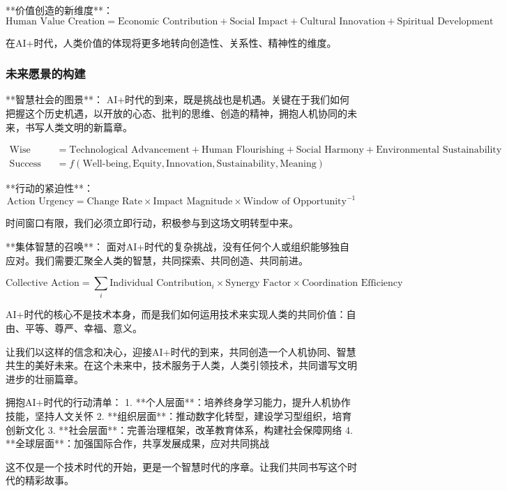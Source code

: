 **价值创造的新维度**：
\begin{equation}
\text{Human Value Creation} = \text{Economic Contribution} + \text{Social Impact} + \text{Cultural Innovation} + \text{Spiritual Development}
\end{equation}

在AI+时代，人类价值的体现将更多地转向创造性、关系性、精神性的维度。

\subsubsection{未来愿景的构建} %

**智慧社会的图景**：
AI+时代的到来，既是挑战也是机遇。关键在于我们如何把握这个历史机遇，以开放的心态、批判的思维、创造的精神，拥抱人机协同的未来，书写人类文明的新篇章。

\begin{align}
\text{Wise Society} &= \text{Technological Advancement} + \text{Human Flourishing} + \text{Social Harmony} + \text{Environmental Sustainability} \\
\text{Success Metrics} &= f(\text{Well-being}, \text{Equity}, \text{Innovation}, \text{Sustainability}, \text{Meaning})
\end{align}

**行动的紧迫性**：
\begin{equation}
\text{Action Urgency} = \text{Change Rate} \times \text{Impact Magnitude} \times \text{Window of Opportunity}^{-1}
\end{equation}

时间窗口有限，我们必须立即行动，积极参与到这场文明转型中来。

**集体智慧的召唤**：
面对AI+时代的复杂挑战，没有任何个人或组织能够独自应对。我们需要汇聚全人类的智慧，共同探索、共同创造、共同前进。

\begin{equation}
\text{Collective Action} = \sum_{i} \text{Individual Contribution}_i \times \text{Synergy Factor} \times \text{Coordination Efficiency}
\end{equation}

\begin{center}
AI+时代的核心不是技术本身，而是我们如何运用技术来实现人类的共同价值：自由、平等、尊严、幸福、意义。
\end{center}

让我们以这样的信念和决心，迎接AI+时代的到来，共同创造一个人机协同、智慧共生的美好未来。在这个未来中，技术服务于人类，人类引领技术，共同谱写文明进步的壮丽篇章。

\begin{center}
拥抱AI+时代的行动清单：
1. **个人层面**：培养终身学习能力，提升人机协作技能，坚持人文关怀
2. **组织层面**：推动数字化转型，建设学习型组织，培育创新文化
3. **社会层面**：完善治理框架，改革教育体系，构建社会保障网络
4. **全球层面**：加强国际合作，共享发展成果，应对共同挑战
\end{center}

这不仅是一个技术时代的开始，更是一个智慧时代的序章。让我们共同书写这个时代的精彩故事。

\nocite{*}
